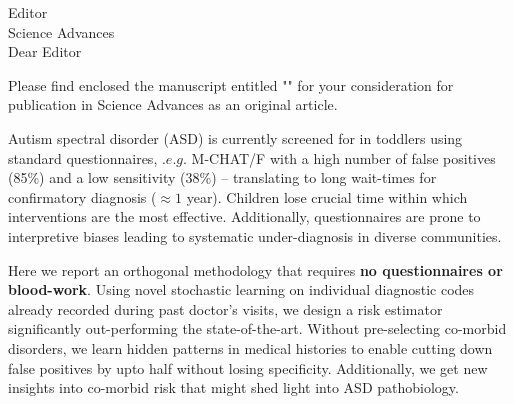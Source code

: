 \documentclass[9pt,onecolumn,compsoc]{IEEEtran}
\newcommand{\Space}{\vspace{10pt}}
\def\BEDITOR{Editor\xspace}
\def\JNAME{Science Advances\xspace}
\def\JADDR{}
\begin{document}
\parskip=12pt
\parindent=0pt
\Space
\Space
\fontsize{11}{12}\selectfont
\Space
\Space

Editor\\ \JNAME\\
\JADDR

Dear \BEDITOR

Please find enclosed the  manuscript entitled "\textbf{\TITLE}" for your consideration for publication in \JNAME as an original article. 

Autism spectral disorder (ASD) is currently  screened for in toddlers using standard questionnaires, $.e.g.$ M-CHAT/F with a  high number of false positives (85\%) and  a low sensitivity (38\%) -- translating to long wait-times for confirmatory diagnosis ($\approx 1$ year). Children lose crucial time within which  interventions are the most effective.  Additionally, questionnaires are prone to interpretive biases leading to systematic under-diagnosis in diverse communities.  %

Here we report an orthogonal methodology that requires \textbf{no questionnaires or blood-work}. Using novel  stochastic learning on individual diagnostic codes already recorded during past doctor's visits, we design  a  risk estimator significantly out-performing the state-of-the-art. Without  pre-selecting co-morbid disorders, we learn hidden patterns in medical histories to enable cutting down false positives by upto half without losing specificity.
Additionally, we get new insights into co-morbid risk that might shed light into ASD pathobiology.

\end{document}
